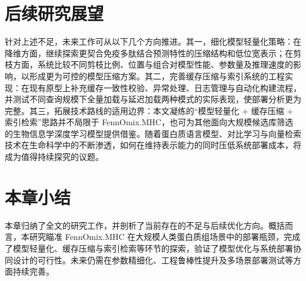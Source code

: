\section{后续研究展望}

针对上述不足，未来工作可从以下几个方向推进。其一，细化模型轻量化策略：在降维方面，继续探索更契合免疫多肽结合预测特性的压缩结构和低位宽表示；在剪枝方面，系统比较不同剪枝比例、位置与组合对模型性能、参数量及推理速度的影响，以形成更为可控的模型压缩方案。其二，完善缓存压缩与索引系统的工程实现：在现有原型上补充缓存一致性校验、异常处理、日志管理与自动化构建流程，并测试不同查询规模下全量加载与延迟加载两种模式的实际表现，使部署分析更为完整。其三，拓展技术路线的适用边界：本文凝练的“模型轻量化 + 缓存压缩 + 索引检索”思路并不局限于 FennOmix.MHC，也可为其他面向大规模候选库筛选的生物信息学深度学习模型提供借鉴。随着蛋白质语言模型、对比学习与向量检索技术在生命科学中的不断渗透，如何在维持表示能力的同时压低系统部署成本，将成为值得持续探究的议题。

\section{本章小结}

本章归纳了全文的研究工作，并剖析了当前存在的不足与后续优化方向。概括而言，本研究瞄准 FennOmix.MHC 在大规模人类蛋白质组场景中的部署瓶颈，完成了模型轻量化、缓存压缩与索引检索等环节的探索，验证了模型优化与系统部署协同设计的可行性。未来仍需在参数精细化、工程鲁棒性提升及多场景部署测试等方面持续完善。